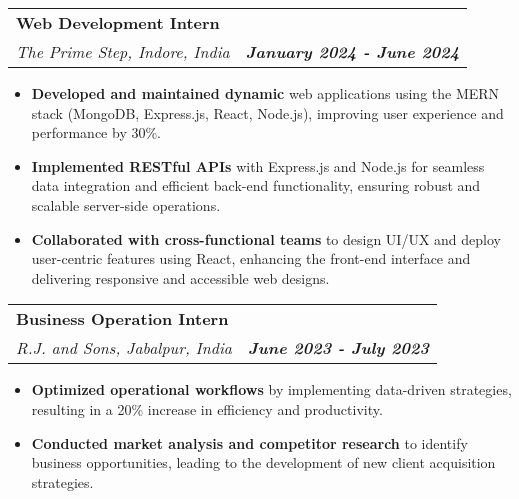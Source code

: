 \documentclass[letterpaper,11pt]{article}
\makeatletter
\newcommand{\resumeItem}[1]{
  \item\small{
    {#1 \vspace{-1pt}}
  }
}
\newcommand{\resumeSubheading}[4]{
  \vspace{-2pt}\item
    \begin{tabular*}{1.0\textwidth}[t]{l@{\extracolsep{\fill}}r}
      \textbf{\large#1} & \textbf{\small #2} \\
      \textit{\large#3} & \textit{\small #4} \\
      
    \end{tabular*}\vspace{-7pt}
}
\newcommand{\resumeSubHeadingListEnd}{\end{itemize}}
\newcommand{\resumeItemListStart}{\begin{itemize}[leftmargin=0.1in]}
\newcommand{\resumeItemListEnd}{\end{itemize}\vspace{-5pt}}
\makeatother
\begin{document}
    \resumeSubheading
      {Web Development Intern {\href{https://drive.google.com/file/d/1ouvkc0bzNij7loCGzaf1QBdajUbVz_ZJ/view?usp=sharing}{\raisebox{-0.2\height}{ 
   \texttt{[image: hy.png]}}}}}{}
      {The Prime Step, Indore, India}{\textbf{January 2024 - June 2024}}
      \resumeItemListStart
            \resumeItem{\normalsize{\textbf{Developed and maintained dynamic }web applications using the MERN stack (MongoDB, Express.js, React, Node.js), improving user experience and performance by 30\%.}}
            \resumeItem{\normalsize{\textbf{Implemented RESTful APIs} with Express.js and Node.js for seamless data integration and efficient back-end functionality, ensuring robust and scalable server-side operations.}}  
            \resumeItem{\normalsize{\textbf{Collaborated with cross-functional teams} to design UI/UX and deploy user-centric features using React, enhancing the front-end interface and delivering responsive and accessible web designs.}}  
      \resumeItemListEnd  
\vspace{-1pt}
    \resumeSubheading
      {Business Operation Intern {\href{https://drive.google.com/file/d/1VJbvjg9TJLzh4ohgE7QDZyM-m0KxBPy0/view}{\raisebox{-0.2\height}{ 
   \texttt{[image: hy.png]}}}}}{} 
      {R.J. and Sons, Jabalpur, India}{\textbf{June 2023 - July 2023}}
      \resumeItemListStart
            \resumeItem{\normalsize{\textbf{Optimized operational workflows} by implementing data-driven strategies, resulting in a 20\% increase in efficiency and productivity.}}
        \resumeItem{\normalsize{\textbf{Conducted market analysis and competitor research} to identify business opportunities, leading to the development of new client acquisition strategies.}}

  \resumeSubHeadingListEnd
\vspace{-17pt}


\end{document}
